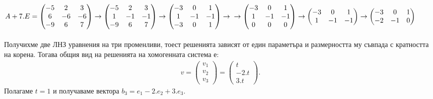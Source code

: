 \documentclass[a4paper, 12pt]{article}
\begin{document}
    $A + 7.E = \begin{pmatrix}
        -5 & 2 & 3\\
        6 & -6 & -6\\
        -9 & 6 & 7
    \end{pmatrix} \to \begin{pmatrix}
        -5 & 2 & 3\\
        1 & -1 & -1\\
        -9 & 6 & 7
    \end{pmatrix} \to \begin{pmatrix}
        -3 & 0 & 1\\
        1 & -1 & -1\\
        -3 & 0 & 1
    \end{pmatrix} \to\\
    \\\\\to \begin{pmatrix}
        -3 & 0 & 1\\
        1 & -1 & -1\\
        0 & 0 & 0
    \end{pmatrix} \to \begin{pmatrix}
        -3 & 0 & 1\\
        1 & -1 & -1
    \end{pmatrix} \to \begin{pmatrix}
        -3 & 0 & 1\\
        -2 & -1 & 0
    \end{pmatrix}$ \\\\
    Получихме две ЛНЗ уравнения на три променливи,
    тоест решенията зависят от един параметъра и размерността
    му съвпада с кратността на корена. Тогава общия вид на решенията
    на хомогенната система е:
    \begin{align*}
        v = \begin{pmatrix}
            v_1 \\
            v_2 \\
            v_3
        \end{pmatrix} = \begin{pmatrix}
            t \\
            -2.t \\
            3.t
        \end{pmatrix}.
    \end{align*}
    Полагаме $t = 1$ и получаваме вектора $b_3 = e_1 - 2.e_2 + 3.e_3$.\\\\
\end{document}
